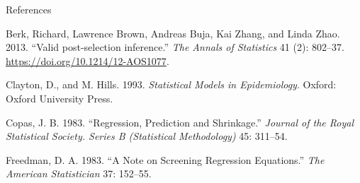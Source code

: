 \documentclass[
  10pt,
  ignorenonframetext,
]{beamer}
\newlength{\cslhangindent}
\newlength{\cslentryspacingunit} %
\newenvironment{CSLReferences}[2] %
 {%
  \setlength{\parindent}{0pt}
  \ifodd #1
  \let\oldpar\par
  \def\par{\hangindent=\cslhangindent\oldpar}
  \fi
  \setlength{\parskip}{#2\cslentryspacingunit}
 }%
 {}
\begin{document}
\begin{frame}{References}
\protect\hypertarget{references}{}
\scriptsize

\hypertarget{refs}{}
\begin{CSLReferences}{1}{0}
\leavevmode{}%
Berk, Richard, Lawrence Brown, Andreas Buja, Kai Zhang, and Linda Zhao.
2013. {``{Valid post-selection inference}.''} \emph{The Annals of
Statistics} 41 (2): 802--37. \url{https://doi.org/10.1214/12-AOS1077}.

\leavevmode{}%
Clayton, D., and M. Hills. 1993. \emph{Statistical Models in
Epidemiology}. Oxford: Oxford University Press.

\leavevmode{}%
Copas, J. B. 1983. {``Regression, Prediction and Shrinkage.''}
\emph{Journal of the Royal Statistical Society. Series B (Statistical
Methodology)} 45: 311--54.

\leavevmode{}%
Freedman, D. A. 1983. {``A Note on Screening Regression Equations.''}
\emph{The American Statistician} 37: 152--55.

\end{CSLReferences}
\end{frame}
\end{document}
